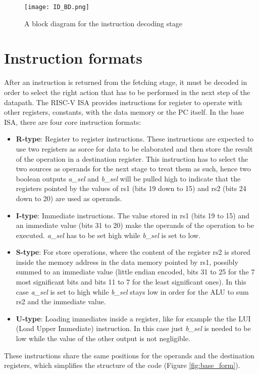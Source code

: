 \begin{figure}[!h]
  \centering
  \texttt{[image: ID\_BD.png]}
  \caption{A block diagram for the instruction decoding stage}
  \label{fig:ID_BD}
\end{figure}

\section{Instruction formats}
After an instruction is returned from the fetching stage, it must be decoded in order to select the right action that has to be performed in the next step of the datapath. The RISC-V ISA provides instructions for register to operate with other registers, constants, with the data memory or the PC itself.
In the base ISA, there are four core instruction formats:
\begin{itemize}
\item \textbf{R-type}: Register to register instructions. These instructions are expected to use two registers as sorce for data to be elaborated and then store the result of the operation in a destination register. This instruction has to select the two sources as operands for the next stage to treat them as such, hence two boolean outputs \emph{a\_sel} and \emph{b\_sel} will be pulled high to indicate that the registers pointed by the values of rs1 (bits 19 down to 15) and rs2 (bits 24 down to 20) are used as operands.
\item \textbf{I-type}: Immediate instructions. The value stored in rs1 (bits 19 to 15) and an immediate value (bits 31 to 20) make the operands of the operation to be executed. \emph{a\_sel} has to be set high while \emph{b\_sel} is set to low.
\item \textbf{S-type}: For store operations, where the content of the register rs2 is stored inside the memory address in the data memory pointed by rs1, possibly summed to an immediate value (little endian encoded, bits 31 to 25 for the 7 most significant bits and bits 11 to 7 for the least significant ones). In this case \emph{a\_sel} is set to high while \emph{b\_sel} stays low in order for the ALU to sum rs2 and the immediate value.
\item \textbf{U-type}: Loading immediates inside a register, like for example the the LUI (Load Upper Immediate) instruction. In this case just \emph{b\_sel} is needed to be low while the value of the other output is not negligible.
\end{itemize}
These instructions share the same positions for the operands and the destination registers, which simplifies the structure of the code (Figure \ref{fig:base_form}).
